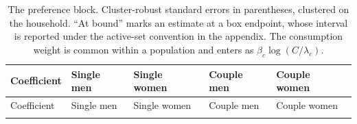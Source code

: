 \small\setlength{\tabcolsep}{3pt}\begin{longtable}[]{@{}
  >{\raggedright\arraybackslash}p{}
  >{\raggedright\arraybackslash}p{}
  >{\raggedright\arraybackslash}p{}
  >{\raggedright\arraybackslash}p{}
  >{\raggedright\arraybackslash}p{}@{}}
\caption{The preference block. Cluster-robust standard errors in parentheses, clustered on the household. ``At bound'' marks an estimate at a box endpoint, whose interval is reported under the active-set convention in the appendix. The consumption weight is common within a population and enters as \(\beta_c\log(C/\lambda_c)\).}\tabularnewline
\toprule\noalign{}
\begin{minipage}[b]{\linewidth}\raggedright
Coefficient
\end{minipage} & \begin{minipage}[b]{\linewidth}\raggedright
Single men
\end{minipage} & \begin{minipage}[b]{\linewidth}\raggedright
Single women
\end{minipage} & \begin{minipage}[b]{\linewidth}\raggedright
Couple men
\end{minipage} & \begin{minipage}[b]{\linewidth}\raggedright
Couple women
\end{minipage} \\
\midrule\noalign{}
\endfirsthead
\toprule\noalign{}
\begin{minipage}[b]{\linewidth}\raggedright
Coefficient
\end{minipage} & \begin{minipage}[b]{\linewidth}\raggedright
Single men
\end{minipage} & \begin{minipage}[b]{\linewidth}\raggedright
Single women
\end{minipage} & \begin{minipage}[b]{\linewidth}\raggedright
Couple men
\end{minipage} & \begin{minipage}[b]{\linewidth}\raggedright
Couple women
\end{minipage} \\
\midrule\noalign{}
\endhead
\bottomrule\noalign{}
\endlastfoot

\end{longtable}
